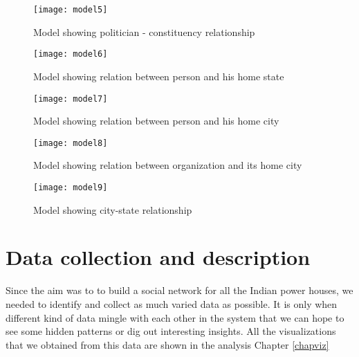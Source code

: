 \begin{figure}[H]
\begin{center}	
\texttt{[image: model5]} 
\caption{Model showing politician  - constituency relationship}
\label{fig:model5}
\end{center}
\end{figure}

\begin{figure}[H]
\begin{center}	
\texttt{[image: model6]} 
\caption{Model showing relation between person and his home state}
\label{fig:model6}
\end{center}
\end{figure}

\begin{figure}[H]
\begin{center}	
\texttt{[image: model7]} 
\caption{Model showing relation between person and his home city}
\label{fig:model7}
\end{center}
\end{figure}

\begin{figure}[H]
\begin{center}	
\texttt{[image: model8]} 
\caption{Model showing relation between organization and its home city}
\label{fig:model8}
\end{center}
\end{figure}

\begin{figure}[H]
\begin{center}	
\texttt{[image: model9]} 
\caption{Model showing city-state relationship}
\label{fig:model9}
\end{center}
\end{figure}

\section{Data collection and description}
\label{datacollect}

Since the aim was to to build a social network for all the Indian power houses, we needed to identify and collect as much varied data as possible. It is only when different kind of data mingle with each other in the system that we can hope to see some hidden patterns or dig out interesting insights. All the visualizations that we obtained from this data are shown in the analysis Chapter \ref{chapviz}

